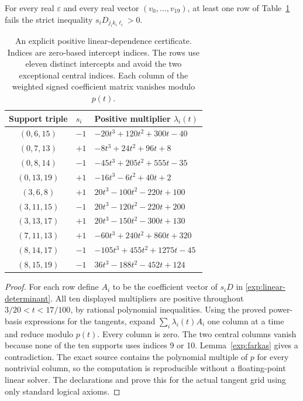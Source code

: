 \begin{theorem}
\label{exp:actual-grid-obstruction}
For every real $\varepsilon$ and every real vector
$(v_0,\ldots,v_{19})$, at least one row of
Table~\ref{exp:ten-signs} fails the strict inequality
$s_iD_{j_i k_i\ell_i}>0$.
\end{theorem}

\begin{table}[tb]
\centering\small
\begin{tabular}{@{}cll@{}}
\toprule
Support triple & $s_i$ & Positive multiplier $\lambda_i(t)$\\
\midrule
$(0,6,15)$ & $-1$ & $-20t^3+120t^2+300t-40$\\
$(0,7,13)$ & $+1$ & $-8t^3+24t^2+96t+8$\\
$(0,8,14)$ & $-1$ & $-45t^3+205t^2+555t-35$\\
$(0,13,19)$ & $+1$ & $-16t^3-6t^2+40t+2$\\
$(3,6,8)$ & $+1$ & $20t^3-100t^2-220t+100$\\
$(3,11,15)$ & $-1$ & $20t^3-120t^2-220t+200$\\
$(3,13,17)$ & $+1$ & $20t^3-150t^2-300t+130$\\
$(7,11,13)$ & $+1$ & $-60t^3+240t^2+860t+320$\\
$(8,14,17)$ & $-1$ & $-105t^3+455t^2+1275t-45$\\
$(8,15,19)$ & $-1$ & $36t^3-188t^2-452t+124$\\
\bottomrule
\end{tabular}
\caption{An explicit positive linear-dependence certificate. Indices are
zero-based intercept indices. The rows use eleven distinct intercepts
and avoid the two exceptional central indices. Each column of the
weighted signed coefficient matrix vanishes modulo $p(t)$.}
\label{exp:ten-signs}
\end{table}

\begin{proof}
For each row define $A_i$ to be the coefficient vector of $s_iD$ in
\eqref{exp:linear-determinant}. All ten displayed multipliers are
positive throughout $3/20<t<17/100$, by rational polynomial inequalities.
Using the proved power-basis expressions for the tangents, expand
$\sum_i\lambda_i(t)A_i$ one column at a time and reduce modulo $p(t)$.
Every column is zero. The two central columns vanish because none of
the ten supports uses indices 9 or 10. Lemma~\ref{exp:farkas} gives a
contradiction. The exact source contains the polynomial multiple of
$p$ for every nontrivial column, so the computation is reproducible
without a floating-point linear solver. The declarations
and
prove this for the actual tangent grid using only standard logical
axioms.
\end{proof}

